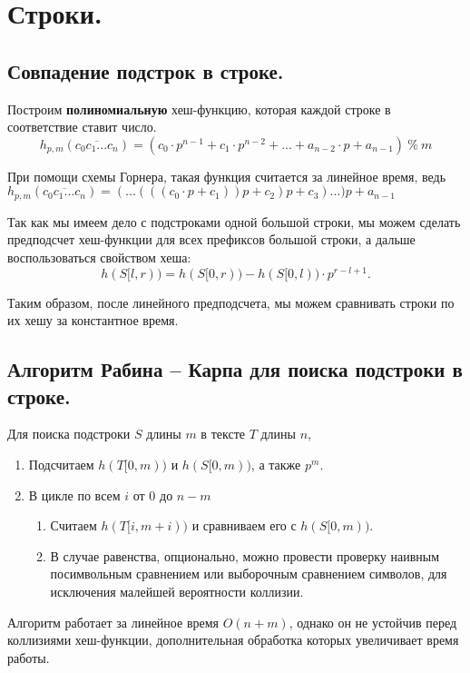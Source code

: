 \section{Строки.}%


\subsection{Совпадение подстрок в строке.}%

Построим \textbf{полиномиальную} хеш-функцию, которая каждой строке в соответствие ставит число.
\[h_{p, m}(\overline{c_{0}c_{1}...c_{n}}) = (c_0 \cdot p^{n - 1} + c_1 \cdot p^{n-2} + ... + a_{n - 2} \cdot p + a_{n - 1}) \ \% \ m\]

При помощи схемы Горнера, такая функция считается за линейное время, ведь $h_{p, m}(\overline{c_{0}c_{1}...c_{n}}) = (...(((c_0 \cdot p + c_1))p + c_2)p + c_3)...)p + a_{n-1}$

Так как мы имеем дело с подстроками одной большой строки, мы можем сделать предподсчет хеш-функции для всех префиксов большой строки, а дальше воспользоваться свойством хеша:
\[
	h(S[l, r)) = h(S[0, r)) - h(S[0, l)) \cdot p^{r - l + 1}
.\] 

Таким образом, после линейного предподсчета, мы можем сравнивать строки по их хешу за константное время.


\subsection{Алгоритм Рабина -- Карпа для поиска подстроки в строке.}%

Для поиска подстроки $S$ длины $m$ в тексте $T$ длины $n$, 
\begin{enumerate}
	\item Подсчитаем $h(T[0, m))$ и $h(S[0, m))$, а также $p^m$.
	\item В цикле по всем $i$ от  $0$ до $n - m$
		\begin{enumerate}
			\item Считаем $h(T[i, m + i))$ и сравниваем его с $h(S[0, m))$. 
			\item В случае равенства, опционально, можно провести проверку наивным посимвольным сравнением или выборочным сравнением символов, для исключения малейшей вероятности коллизии.
		\end{enumerate}
\end{enumerate}

Алгоритм работает за линейное время $O(n + m)$, однако он не устойчив перед коллизиями хеш-функции, дополнительная обработка которых увеличивает время работы.


